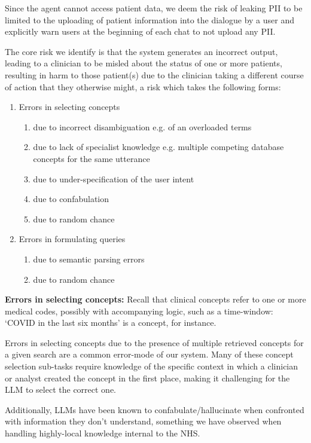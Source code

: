 \documentclass[11pt]{article}
\begin{document}
Since the agent cannot access patient data, we deem the risk of leaking PII to be limited to the uploading of patient information into the dialogue by a user and explicitly warn users at the beginning of each chat to not upload any PII.

The core risk we identify is that the system generates an incorrect output, leading to a clinician to be misled about the status of one or more patients, resulting in harm to those patient(s) due to the clinician taking a different course of action that they otherwise might, a risk which takes the following forms:

\begin{enumerate}
	\item Errors in selecting concepts
	\begin{enumerate}
		\item due to incorrect disambiguation e.g. of an overloaded terms
		\item due to lack of specialist knowledge e.g. multiple competing database concepts for the same utterance   
		\item due to under-specification of the user intent
		\item due to confabulation
		\item due to random chance
	\end{enumerate}
	\item Errors in formulating queries
	\begin{enumerate}
		\item due to semantic parsing errors 
		\item due to random chance
	\end{enumerate}
\end{enumerate}

\textbf{Errors in selecting concepts:}
Recall that clinical concepts refer to one or more medical codes, possibly with accompanying logic, such as a time-window: `COVID in the last six months' is a concept, for instance.

Errors in selecting concepts due to the presence of multiple retrieved concepts for a given search are a common error-mode of our system. Many of these concept selection sub-tasks require knowledge of the specific context in which a clinician or analyst created the concept in the first place, making it challenging for the LLM to select the correct one.

Additionally, LLMs have been known to confabulate/hallucinate when confronted with information they don't understand, something we have observed when handling highly-local knowledge internal to the NHS.
\end{document}
